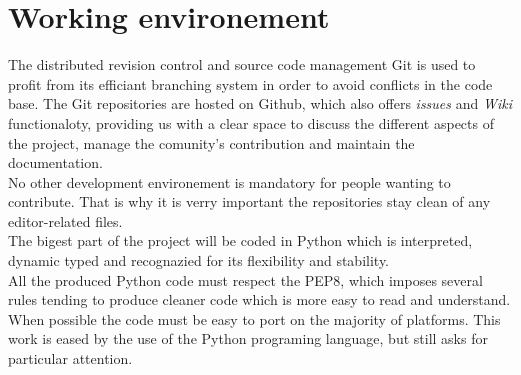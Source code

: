 \section{Working environement}
The distributed revision control and source code management Git is used to profit from its efficiant branching system in order to avoid conflicts in the code base.
The Git repositories are hosted on Github, which also offers \textit{issues} and \textit{Wiki} functionaloty, providing us with a clear space to discuss the different aspects of the project, manage the comunity's contribution and maintain the documentation.\\

No other development environement is mandatory for people wanting to contribute. That is why it is verry important the repositories stay clean of any editor-related files.\\

The bigest part of the project will be coded in Python which is interpreted, dynamic typed and recognazied for its flexibility and stability.\\
All the produced Python code must respect the PEP8, which imposes several rules tending to produce cleaner code which is more easy to read and understand.\\

When possible the code must be easy to port on the majority of platforms. This work is eased by the use of the Python programing language, but still asks for particular attention.
